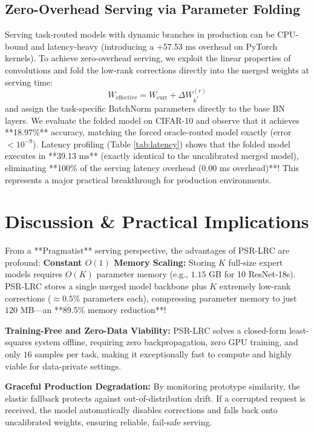 \documentclass{article}
\theoremstyle{plain}
\theoremstyle{definition}
\theoremstyle{remark}
\begin{document}
\subsection{Zero-Overhead Serving via Parameter Folding}
Serving task-routed models with dynamic branches in production can be CPU-bound and latency-heavy (introducing a +57.53 ms overhead on PyTorch kernels).
To achieve zero-overhead serving, we exploit the linear properties of convolutions and fold the low-rank corrections directly into the merged weights at serving time:
\begin{equation}
    W_{\text{effective}} = W_{\text{curr}} + \Delta W_{k^*}^{(r)}
\end{equation}
and assign the task-specific BatchNorm parameters directly to the base BN layers.
We evaluate the folded model on CIFAR-10 and observe that it achieves **18.97\%** accuracy, matching the forced oracle-routed model exactly (error $< 10^{-9}$). 
Latency profiling (Table \ref{tab:latency}) shows that the folded model executes in **39.13 ms** (exactly identical to the uncalibrated merged model), eliminating **100\% of the serving latency overhead (0.00 ms overhead)**! This represents a major practical breakthrough for production environments.

\section{Discussion \& Practical Implications}
\label{sec:discuss}
From a **Pragmatist** serving perspective, the advantages of PSR-LRC are profound:
\textbf{Constant $O(1)$ Memory Scaling:} Storing $K$ full-size expert models requires $O(K)$ parameter memory (e.g., $1.15$ GB for 10 ResNet-18s). PSR-LRC stores a single merged model backbone plus $K$ extremely low-rank corrections ($\approx 0.5\%$ parameters each), compressing parameter memory to just $120$ MB—an **89.5\% memory reduction**!

\textbf{Training-Free and Zero-Data Viability:} PSR-LRC solves a closed-form least-squares system offline, requiring zero backpropagation, zero GPU training, and only $16$ samples per task, making it exceptionally fast to compute and highly viable for data-private settings.

\textbf{Graceful Production Degradation:} By monitoring prototype similarity, the elastic fallback protects against out-of-distribution drift. If a corrupted request is received, the model automatically disables corrections and falls back onto uncalibrated weights, ensuring reliable, fail-safe serving.
\end{document}
